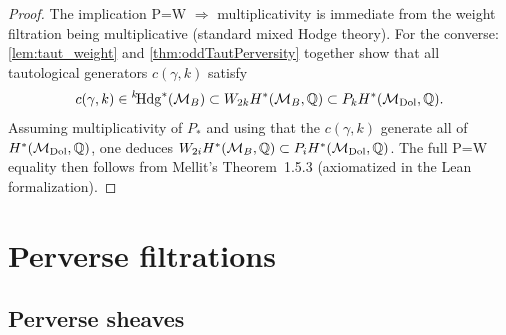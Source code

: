\begin{proof}
  The implication P=W \(\Rightarrow\) multiplicativity is immediate from the
  weight filtration being multiplicative (standard mixed Hodge theory).  For
  the converse: \cref{lem:taut_weight} and \cref{thm:oddTautPerversity}
  together show that all tautological generators \(c(\gamma,k)\) satisfy
  \[
    c(\gamma,k) \in {}^{k}\!\mathrm{Hdg}^{*}(\mathcal{M}_B) \subset W_{2k} H^*(\mathcal{M}_B,\mathbb{Q})
      \subset P_k H^*(\mathcal{M}_{\mathrm{Dol}},\mathbb{Q}).
  \]
  Assuming multiplicativity of \(P_*\) and using that the \(c(\gamma,k)\)
  generate all of \(H^*(\mathcal{M}_{\mathrm{Dol}},\mathbb{Q})\), one deduces
  \(W_{2i} H^*(\mathcal{M}_B,\mathbb{Q}) \subset P_i H^*(\mathcal{M}_{\mathrm{Dol}},\mathbb{Q})\).
  The full P=W equality then follows from Mellit's Theorem~1.5.3
  (axiomatized in the Lean formalization).
\end{proof}

\section{Perverse filtrations}

\subsection{Perverse sheaves}


